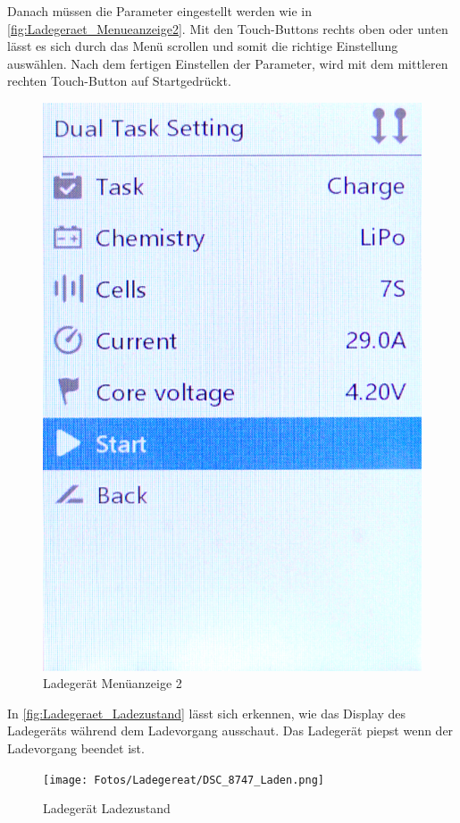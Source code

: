Danach müssen die Parameter eingestellt werden wie in \autoref{fig:Ladegeraet_Menueanzeige2}. Mit den Touch-Buttons rechts oben oder unten lässt es sich durch das Menü 
scrollen und somit die richtige Einstellung auswählen. Nach dem fertigen Einstellen der Parameter, wird mit dem mittleren rechten Touch-Button auf \glqq Start\grqq gedrückt. 
\begin{figure}[H]
    \centering
    \includegraphics[width=.3\textwidth]{Fotos/Ladegereat/DSC_8745_Lademenue_2.png}
    \caption{Ladegerät Menüanzeige 2 \label{fig:Ladegeraet_Menueanzeige2}}
\end{figure}

In \autoref{fig:Ladegeraet_Ladezustand} lässt sich erkennen, wie das Display des Ladegeräts während dem Ladevorgang ausschaut.
Das Ladegerät piepst wenn der Ladevorgang beendet ist. 
\begin{figure}[H]
    \centering
    \texttt{[image: Fotos/Ladegereat/DSC\_8747\_Laden.png]}
    \caption{Ladegerät Ladezustand \label{fig:Ladegeraet_Ladezustand}}
\end{figure}

